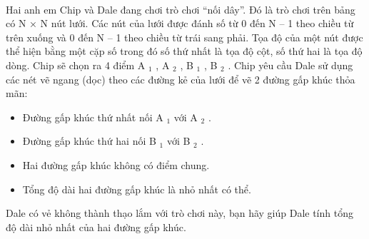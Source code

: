  

Hai anh em Chip và Dale đang chơi trò chơi “nối dây”. Đó là trò chơi trên bảng có N × N nút lưới. Các nút của lưới được đánh số từ 0 đến N – 1 theo chiều từ trên xuống và 0 đến N – 1 theo chiều từ trái sang phải. Tọa độ của một nút được thể hiện bằng một cặp số trong đó số thứ nhất là tọa độ cột, số thứ hai là tọa độ dòng. Chip sẽ chọn ra 4 điểm A $_ 1 $ , A $_ 2 $ , B $_ 1 $ , B $_ 2 $ . Chip yêu cầu Dale sử dụng các nét vẽ ngang (dọc) theo các đường kẻ của lưới để vẽ 2 đường gấp khúc thỏa mãn:
\begin{itemize}
	\item Đường gấp khúc thứ nhất nối A $_ 1 $ với A $_ 2 $ .
	\item Đường gấp khúc thứ hai nối B $_ 1 $ với B $_ 2 $ .
	\item Hai đường gấp khúc không có điểm chung.
	\item Tổng độ dài hai đường gấp khúc là nhỏ nhất có thể.
\end{itemize}

Dale có vẻ không thành thạo lắm với trò chơi này, bạn hãy giúp Dale tính tổng độ dài nhỏ nhất của hai đường gấp khúc.

\